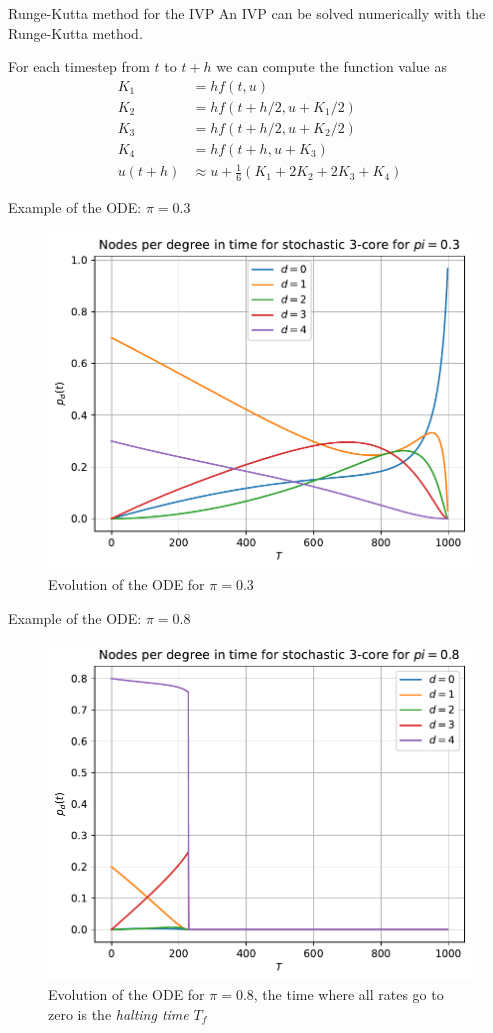 \documentclass[handout]{beamer}
\begin{document}
\begin{frame}{Runge-Kutta method for the IVP}
    An IVP can be solved numerically with the \alert{Runge-Kutta} method. 

    For each timestep from $t$ to $t+h$ we can compute \cite{oderk} the function
    value as
    \begin{align}
        K_1 &= h f(t, u)\\
        K_2 &= h f(t + h/2, u + K_1/2)\\
        K_3 &= h f(t + h/2, u + K_2/2)\\
        K_4 &= h f(t + h, u + K_3)\\
        u(t+h) &\approx u + \frac{1}{6}(K_1 + 2 K_2 + 2 K_3 + K_4)
    \end{align}
\end{frame}

\begin{frame}{Example of the ODE: $\pi=0.3$}
    \begin{figure}
        \centering
        \includegraphics[width=.6\textwidth]{ode_evol_pi03.pdf}
        \caption{Evolution of the ODE for $\pi=0.3$}
        \label{ref:ode_evol_pi03}
    \end{figure}
\end{frame}

\begin{frame}{Example of the ODE: $\pi=0.8$}
    \begin{figure}
        \centering
        \includegraphics[width=.6\textwidth]{ode_evol_pi08.pdf}
        \caption{Evolution of the ODE for $\pi=0.8$, the time where all rates
        go to zero is the \emph{halting time} $T_f$}
        \label{ref:ode_evol_pi03}
    \end{figure}
\end{frame}
\end{document}
